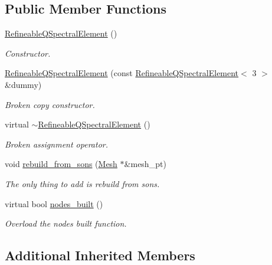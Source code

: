 \subsection*{Public Member Functions}
\begin{DoxyCompactItemize}
\item 
\hyperlink{classoomph_1_1RefineableQSpectralElement_3_013_01_4_ab95cf02c87a2d5006c7f44f2f98408b8}{Refineable\+Q\+Spectral\+Element} ()
\begin{DoxyCompactList}\small\item\em Constructor. \end{DoxyCompactList}\item 
\hyperlink{classoomph_1_1RefineableQSpectralElement_3_013_01_4_a0d3a13e1cbc4b5dd4b526a2d88daf154}{Refineable\+Q\+Spectral\+Element} (const \hyperlink{classoomph_1_1RefineableQSpectralElement}{Refineable\+Q\+Spectral\+Element}$<$ 3 $>$ \&dummy)
\begin{DoxyCompactList}\small\item\em Broken copy constructor. \end{DoxyCompactList}\item 
virtual \hyperlink{classoomph_1_1RefineableQSpectralElement_3_013_01_4_a16e4167363497685ed2465fcc0c32267}{$\sim$\+Refineable\+Q\+Spectral\+Element} ()
\begin{DoxyCompactList}\small\item\em Broken assignment operator. \end{DoxyCompactList}\item 
void \hyperlink{classoomph_1_1RefineableQSpectralElement_3_013_01_4_a57a4a5ac247be0030de74d6ca7f5bdab}{rebuild\+\_\+from\+\_\+sons} (\hyperlink{classoomph_1_1Mesh}{Mesh} $\ast$\&mesh\+\_\+pt)
\begin{DoxyCompactList}\small\item\em The only thing to add is rebuild from sons. \end{DoxyCompactList}\item 
virtual bool \hyperlink{classoomph_1_1RefineableQSpectralElement_3_013_01_4_a7e8e8d5ed170fef28820dae9748a1e99}{nodes\+\_\+built} ()
\begin{DoxyCompactList}\small\item\em Overload the nodes built function. \end{DoxyCompactList}\end{DoxyCompactItemize}
\subsection*{Additional Inherited Members}


